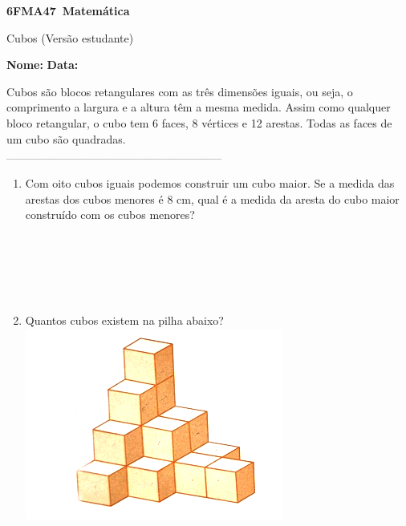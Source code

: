 \documentclass[a4paper,14pt]{article}
\begin{document}
	
	\noindent\textbf{6FMA47~Matemática} 
	
	\begin{center}Cubos (Versão estudante)
	\end{center}
	
	\noindent\textbf{Nome:} \underline{\hspace{10cm}}
	\noindent\textbf{Data:} \underline{\hspace{4cm}}
	
	
	
    \begin{multicols}{2}
    	Cubos são blocos retangulares com as três dimensões iguais, ou seja, o comprimento a largura e a altura têm a mesma medida. Assim como qualquer bloco retangular, o cubo tem 6 faces, 8 vértices e 12 arestas. Todas as faces de um cubo são quadradas.\\
    	\textsubscript{---------------------------------------------------------------------}
    	\begin{enumerate}
    		\item Com oito cubos iguais podemos construir um cubo maior. Se a medida das arestas dos cubos menores é 8 cm, qual é a medida da aresta do cubo maior construído com os cubos menores?
\\\\\\\\\\\\
    		\item Quantos cubos existem na pilha abaixo? \\
    		\includegraphics[width=1\linewidth]{6FMA47_imagens/imagem1}

\end{enumerate}
\end{multicols}
\end{document}
